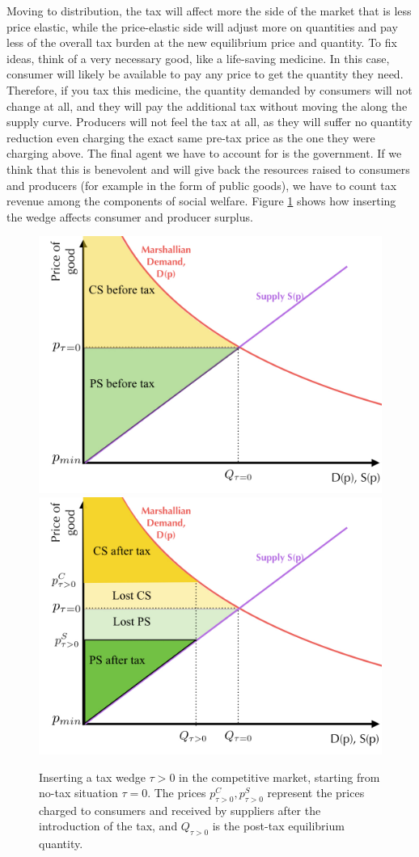 \documentclass[11pt,english]{article}
\begin{document}
Moving to distribution, the tax will affect more the side of the market that is less price elastic, while the price-elastic side will adjust more on quantities and pay less of the overall tax burden at the new equilibrium price and quantity. To fix ideas, think of a very necessary good, like a life-saving medicine. In this case, consumer will likely be available to pay any price to get the quantity they need. Therefore, if you tax this medicine, the quantity demanded by consumers will not change at all, and they will pay the additional tax without moving the along the supply curve. Producers will not feel the tax at all, as they will suffer no quantity reduction even charging the exact same pre-tax price as the one they were charging above. The final agent we have to account for is the government. If we think that this is benevolent and will give back the resources raised to consumers and producers (for example in the form of public goods), we have to count tax revenue among the components of social welfare. Figure \ref{fig:tax1} shows how inserting the wedge affects consumer and producer surplus.

\begin{figure}[t!]
	\centering
	\includegraphics[width=0.5\linewidth]{Figures/Tax1}\includegraphics[width=0.5\linewidth]{Figures/Tax2}
	\caption{Inserting a tax wedge $\tau>0$ in the competitive market, starting from no-tax situation $\tau=0$. The prices $p^C_{\tau>0},p^S_{\tau>0}$ represent the prices charged to consumers and received by suppliers after the introduction of the tax, and $Q_{\tau>0}$ is the post-tax equilibrium quantity.}
	\label{fig:tax1}
\end{figure}
\end{document}
